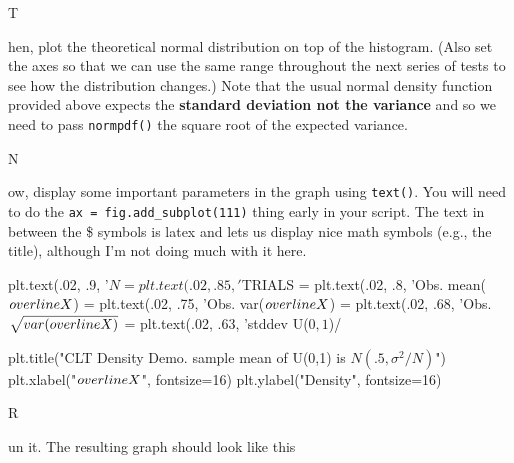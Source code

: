 \documentclass[titlepage]{tufte-book}
\newcounter{problem}
\newcommand{\step}[1]{{}
\vspace{4pt} \noindent {\bf \theproblem. }#1\addtocounter{problem}{1}}
\begin{document}
\begin{fullwidth}
\step Then, plot the theoretical normal distribution on top of the histogram. (Also set the axes so that we can use the same range throughout the next series of tests to see how the distribution changes.) Note that the usual normal density function provided above expects the {\bf standard deviation not the variance} and so we need to pass {\tt normpdf()} the square root of the expected variance. 

\step Now, display some important parameters in the graph using {\tt text()}. You will need to do the {\tt ax = fig.add\_subplot(111)} thing early in your script. The text in between the \$ symbols is latex and lets us display nice math symbols (e.g., the title), although I'm not doing much with it here.

\begin{pyverbatim}
plt.text(.02, .9, '$N = %
plt.text(.02, .85, '$TRIALS = %
plt.text(.02, .8, 'Obs. mean($\\overline{X}$) = %
plt.text(.02, .75, 'Obs. var($\\overline{X}$) = %
plt.text(.02, .68, 'Obs. $\sqrt{var(\\overline{X})}$ = %
plt.text(.02, .63, 'stddev U($0,1$)/%

plt.title("CLT Density Demo. sample mean of U(0,1) is $N(.5, \sigma^2/N)$")
plt.xlabel("$\\overline{X}$", fontsize=16)
plt.ylabel("Density", fontsize=16)
\end{pyverbatim}

\step Run it. The resulting graph should look like this \\



\end{fullwidth}
\end{document}
